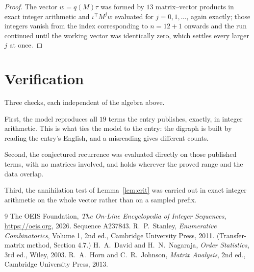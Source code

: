 \documentclass[11pt,a4paper]{article}
\theoremstyle{plain}
\theoremstyle{definition}
\begin{document}
\begin{proof}
The vector $w=q(M)\tau$ was formed by $13$ matrix--vector products in exact integer
arithmetic and $\iota^{\!\top}M^{j}w$ evaluated for $j=0,1,\dots$, again exactly; those
integers vanish from the index corresponding to $n=12+1$ onwards and the run continued
until the working vector was identically zero, which settles every larger $j$ at once.
\end{proof}

\section{Verification}

Three checks, each independent of the algebra above.

First, the model reproduces all $19$ terms the entry publishes, exactly, in integer
arithmetic. This is what ties the model to the entry: the digraph is built by reading the
entry's English, and a misreading gives different counts.

Second, the conjectured recurrence was evaluated directly on those published terms, with no
matrices involved, and holds wherever the proved range and the data overlap.

Third, the annihilation test of Lemma~\ref{lem:crit} was carried out in exact integer
arithmetic on the whole vector rather than on a sampled prefix.

\begin{thebibliography}{9}
 The OEIS Foundation, \emph{The On-Line Encyclopedia of Integer
Sequences}, \url{https://oeis.org}, 2026. Sequence A237843.
 R.~P.~Stanley, \emph{Enumerative Combinatorics}, Volume 1, 2nd ed.,
Cambridge University Press, 2011. (Transfer-matrix method, Section 4.7.)
 H.~A.~David and H.~N.~Nagaraja, \emph{Order Statistics}, 3rd ed., Wiley,
2003.
 R.~A.~Horn and C.~R.~Johnson, \emph{Matrix Analysis}, 2nd ed., Cambridge
University Press, 2013.
\end{thebibliography}
\end{document}

